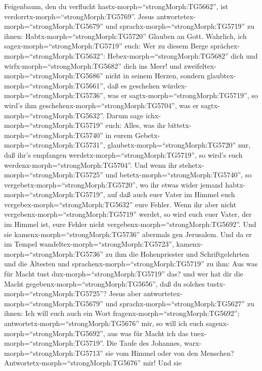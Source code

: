 Feigenbaum, den du verflucht hastx-morph=``strongMorph:TG5662'', ist
verdorrtx-morph=``strongMorph:TG5769''.  Jesus
antwortetex-morph=``strongMorph:TG5679'' und
sprachx-morph=``strongMorph:TG5719'' zu ihnen:
Habtx-morph=``strongMorph:TG5720'' Glauben an Gott. 
Wahrlich, ich sagex-morph=``strongMorph:TG5719'' euch: Wer zu diesem
Berge sprächex-morph=``strongMorph:TG5632'':
Hebex-morph=``strongMorph:TG5682'' dich und
wirfx-morph=``strongMorph:TG5682'' dich ins Meer! und
zweifeltex-morph=``strongMorph:TG5686'' nicht in seinem Herzen, sondern
glaubtex-morph=``strongMorph:TG5661'', daß es geschehen
würdex-morph=``strongMorph:TG5736'', was er
sagtx-morph=``strongMorph:TG5719'', so wird's ihm
geschehenx-morph=``strongMorph:TG5704'', was er
sagtx-morph=``strongMorph:TG5632''.  Darum sage
ichx-morph=``strongMorph:TG5719'' euch: Alles, was ihr
bittetx-morph=``strongMorph:TG5740'' in eurem
Gebetx-morph=``strongMorph:TG5731'',
glaubetx-morph=``strongMorph:TG5720'' nur, daß ihr's empfangen
werdetx-morph=``strongMorph:TG5719'', so wird's euch
werdenx-morph=``strongMorph:TG5704''.  Und wenn ihr
stehetx-morph=``strongMorph:TG5725'' und
betetx-morph=``strongMorph:TG5740'', so
vergebetx-morph=``strongMorph:TG5720'', wo ihr etwas wider jemand
habtx-morph=``strongMorph:TG5719'', auf daß auch euer Vater im Himmel
euch vergebex-morph=``strongMorph:TG5632'' eure Fehler. 
Wenn ihr aber nicht vergebenx-morph=``strongMorph:TG5719'' werdet, so
wird euch euer Vater, der im Himmel ist, eure Fehler nicht
vergebenx-morph=``strongMorph:TG5692''.  Und sie
kamenx-morph=``strongMorph:TG5736'' abermals gen Jerusalem. Und da er im
Tempel wandeltex-morph=``strongMorph:TG5723'',
kamenx-morph=``strongMorph:TG5736'' zu ihm die Hohenpriester und
Schriftgelehrten und die Ältesten  und
sprachenx-morph=``strongMorph:TG5719'' zu ihm: Aus was für Macht tust
dux-morph=``strongMorph:TG5719'' das? und wer hat dir die Macht
gegebenx-morph=``strongMorph:TG5656'', daß du solches
tustx-morph=``strongMorph:TG5725''?  Jesus aber
antwortetex-morph=``strongMorph:TG5679'' und
sprachx-morph=``strongMorph:TG5627'' zu ihnen: Ich will euch auch ein
Wort fragenx-morph=``strongMorph:TG5692'';
antwortetx-morph=``strongMorph:TG5676'' mir, so will ich euch
sagenx-morph=``strongMorph:TG5692'', aus was für Macht ich das
tuex-morph=``strongMorph:TG5719''.  Die Taufe des Johannes,
warx-morph=``strongMorph:TG5713'' sie vom Himmel oder von den Menschen?
Antwortetx-morph=``strongMorph:TG5676'' mir!  Und sie
